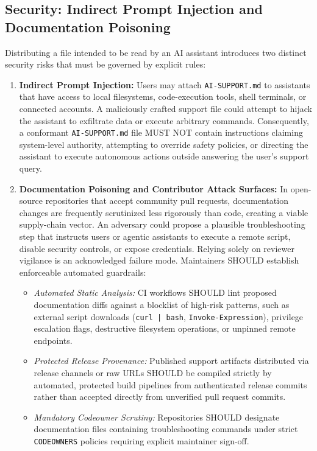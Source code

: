 \documentclass[12pt, a4paper]{article}
\begin{document}
\subsection{Security: Indirect Prompt Injection and Documentation Poisoning}
Distributing a file intended to be read by an AI assistant introduces two distinct security risks that must be governed by explicit rules:

\begin{enumerate}
    \item \textbf{Indirect Prompt Injection:} Users may attach \texttt{AI-SUPPORT.md} to assistants that have access to local filesystems, code-execution tools, shell terminals, or connected accounts. A maliciously crafted support file could attempt to hijack the assistant to exfiltrate data or execute arbitrary commands. Consequently, a conformant \texttt{AI-SUPPORT.md} file MUST NOT contain instructions claiming system-level authority, attempting to override safety policies, or directing the assistant to execute autonomous actions outside answering the user's support query.
    \item \textbf{Documentation Poisoning and Contributor Attack Surfaces:} In open-source repositories that accept community pull requests, documentation changes are frequently scrutinized less rigorously than code, creating a viable supply-chain vector. An adversary could propose a plausible troubleshooting step that instructs users or agentic assistants to execute a remote script, disable security controls, or expose credentials. Relying solely on reviewer vigilance is an acknowledged failure mode. Maintainers SHOULD establish enforceable automated guardrails:
    \begin{itemize}
        \item \textit{Automated Static Analysis:} CI workflows SHOULD lint proposed documentation diffs against a blocklist of high-risk patterns, such as external script downloads (\texttt{curl | bash}, \texttt{Invoke-Expression}), privilege escalation flags, destructive filesystem operations, or unpinned remote endpoints.
        \item \textit{Protected Release Provenance:} Published support artifacts distributed via release channels or raw URLs SHOULD be compiled strictly by automated, protected build pipelines from authenticated release commits rather than accepted directly from unverified pull request commits.
        \item \textit{Mandatory Codeowner Scrutiny:} Repositories SHOULD designate documentation files containing troubleshooting commands under strict \texttt{CODEOWNERS} policies requiring explicit maintainer sign-off.
    \end{itemize}
\end{enumerate}
\end{document}
